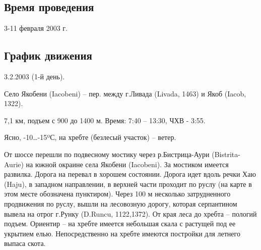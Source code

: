 \subsection{Время проведения}

3-11 февраля 2003 г.

\subsection{График движения}

3.2.2003 (1-й день).

Село Якобени (Iacobeni) – пер. между г.Ливада (Livada, 1463) и Якоб (Iacob, 1322).

7,1 км, подъем с 900 до 1400 м. Время: 7:40 – 13:30, ЧХВ - 3:55.

Ясно, -10…-15ºС, на хребте (безлесый участок) – ветер.

От шоссе перешли по подвесному мостику через р.Бистрица-Аури (Bistrita-Aurie)
на южной окраине села Якобени (Iacobeni). За мостиком имеется развилка. Дорога
на перевал в хорошем состоянии. Дорога идет вдоль речки Хаю (Haju), в западном
направлении, в верхней части проходит по руслу (на карте в этом месте
обозначена пунктиром). Через 100 м несколько затрудненного продвижения по
руслу, вышли на лесовозную дорогу, которая серпантином вывела на отрог г.Рунку
(D.Runcu, 1122,1372). От края леса до хребта – пологий подъем. Ориентир – на
хребте имеется небольшая скала с растущей под ее укрытием елью. Непосредственно
на хребте имеются постройки для летнего выпаса скота.


